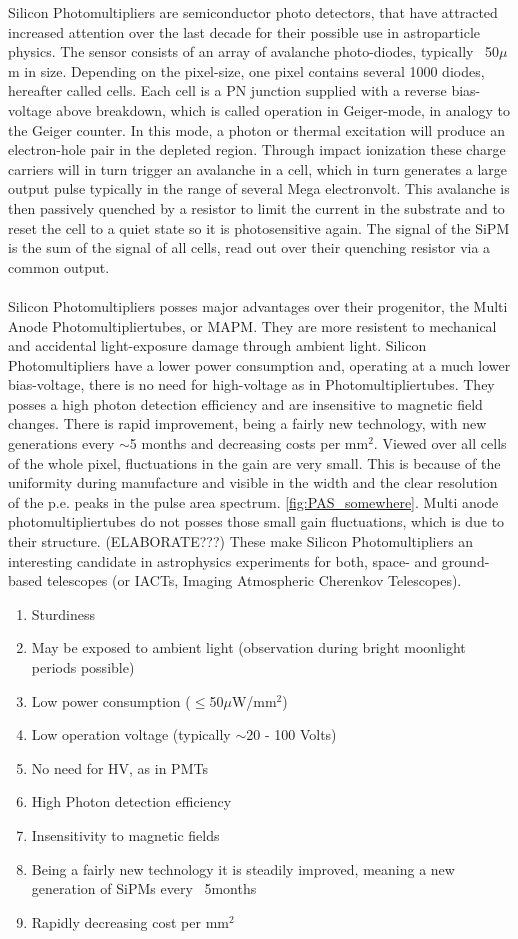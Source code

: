 \documentclass[article,type=msc,colorback,accentcolor=tud9c]{tudthesis}
\begin{document}
Silicon Photomultipliers are semiconductor photo detectors, that have attracted increased attention over the last decade for their possible use in astroparticle physics. The sensor consists of an array of avalanche photo-diodes, typically ~50$\mu$m in size. Depending on the pixel-size, one pixel contains several 1000 diodes, hereafter called cells. Each cell is a PN junction supplied with a reverse bias-voltage above breakdown, which is called operation in Geiger-mode, in analogy to the Geiger counter. In this mode, a photon or thermal excitation will produce an electron-hole pair in the depleted region. Through impact ionization these charge carriers will in turn trigger an avalanche in a cell, which in turn generates a large output pulse typically in the range of several Mega electronvolt. This avalanche is then passively quenched by a resistor to limit the current in the substrate and to reset the cell to a quiet state so it is photosensitive again. The signal of the SiPM is the sum of the signal of all cells, read out over their quenching resistor via a common output.\\\\
Silicon Photomultipliers posses major advantages over their progenitor, the Multi Anode Photomultipliertubes, or MAPM. They are more resistent to mechanical and accidental light-exposure damage through ambient light. Silicon Photomultipliers have a lower power consumption and, operating at a much lower bias-voltage, there is no need for high-voltage as in Photomultipliertubes. They posses a high photon detection efficiency and are insensitive to magnetic field changes. There is rapid improvement, being a fairly new technology, with new generations every $\sim$5 months and decreasing costs per mm$^2$. Viewed over all cells of the whole pixel, fluctuations in the gain are very small. This is because of the uniformity during manufacture and visible in the width and the clear resolution of the p.e. peaks in the pulse area spectrum. \ref{fig:PAS_somewhere}. Multi anode photomultipliertubes do not posses those small gain fluctuations, which is due to their structure. (ELABORATE???) These make Silicon Photomultipliers an interesting candidate in astrophysics experiments for both, space- and ground-based telescopes (or IACTs, Imaging Atmospheric Cherenkov Telescopes). 
\begin{enumerate}
\item Sturdiness
\item May be exposed to ambient light (observation during bright moonlight periods possible)
\item Low power consumption ($\leq$50$\mu$W/mm$^2$)
\item Low operation voltage (typically $\sim$20 - 100 Volts)
\item No need for HV, as in PMTs
\item High Photon detection efficiency
\item Insensitivity to magnetic fields
\item Being a fairly new technology it is steadily improved, meaning a new generation of SiPMs every ~5months
\item Rapidly decreasing cost per mm$^2$
\end{enumerate}
\end{document}
